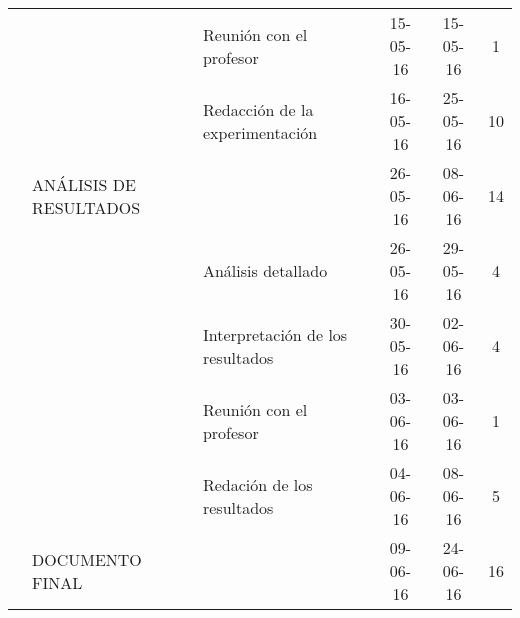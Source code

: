 \begin{table}[H]
{\begin{tabular}{lllccc}
     &                               & Reunión con el profesor                            & 15-05-16                                                           & 15-05-16                                                            & 1                                                                  \\
     &                               & Redacción de la experimentación                    & 16-05-16                                                           & 25-05-16                                                            & 10                                                                 \\ \hline
     & ANÁLISIS DE RESULTADOS        &                                                    & 26-05-16                                                           & 08-06-16                                                            & 14                                                                 \\
     &                               & Análisis detallado                                 & 26-05-16                                                           & 29-05-16                                                            & 4                                                                  \\
     &                               & Interpretación de los resultados                   & 30-05-16                                                           & 02-06-16                                                            & 4                                                                  \\
     &                               & Reunión con el profesor                            & 03-06-16                                                           & 03-06-16                                                            & 1                                                                  \\
     &                               & Redación de los resultados                         & 04-06-16                                                           & 08-06-16                                                            & 5                                                                  \\ \hline
     & DOCUMENTO FINAL               &                                                    & 09-06-16                                                           & 24-06-16                                                            & 16                                                                 \\

\end{tabular}}
\end{table}
